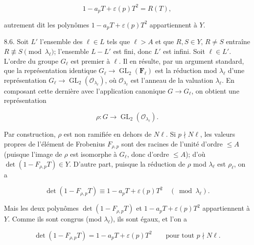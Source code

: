 \documentclass[10pt,oneside]{article}
\begin{document}
\begin{equation*}
1-a_pT+\varepsilon(p)T^2=R(T),
\end{equation*}

autrement dit les polynômes \(1-a_pT+\varepsilon(p)T^2\) appartiennent à \(Y\).\par

8.6. Soit \(L'\) l'ensemble des \(\ell\in L\) tels que \(\ell>A\) et que \(R,S\in Y\), \(R\ne S\) entraîne \(R\not\equiv S\pmod{\lambda_\ell}\); l'ensemble \(L-L'\) est fini, donc \(L'\) est infini. Soit \(\ell\in L'\). L'ordre du groupe \(G_\ell\) est premier à \(\ell\). Il en résulte, par un argument standard, que la représentation identique \(G_\ell\longrightarrow\operatorname{GL}_2(\mathbf F_\ell)\) est la réduction mod \(\lambda_\ell\) d'une représentation \(G_\ell\longrightarrow\operatorname{GL}_2(\mathcal O_{\lambda_\ell})\), où \(\mathcal O_{\lambda_\ell}\) est l'anneau de la valuation \(\lambda_\ell\). En composant cette dernière avec l'application canonique \(G\longrightarrow G_\ell\), on obtient une représentation\par

\begin{equation*}
\rho:G\longrightarrow\operatorname{GL}_2(\mathcal O_{\lambda_\ell}).
\end{equation*}

Par construction, \(\rho\) est non ramifiée en dehors de \(N\ell\). Si \(p\nmid N\ell\), les valeurs propres de l'élément de Frobenius \(F_{\rho,p}\) sont des racines de l'unité d'ordre \(\leq A\) (puisque l'image de \(\rho\) est isomorphe à \(G_\ell\), donc d'ordre \(\leq A\)); d'où \(\det(1-F_{\rho,p}T)\in Y\). D'autre part, puisque la réduction de \(\rho\) mod \(\lambda_\ell\) est \(\rho_\ell\), on a\par

\begin{equation*}
\det(1-F_{\rho,p}T)\equiv1-a_pT+\varepsilon(p)T^2
\quad(\bmod\lambda_\ell).
\end{equation*}

Mais les deux polynômes \(\det(1-F_{\rho,p}T)\) et \(1-a_pT+\varepsilon(p)T^2\) appartiennent à \(Y\). Comme ils sont congrus (mod \(\lambda_\ell\)), ils sont égaux, et l'on a\par

\begin{equation*}
\det(1-F_{\rho,p}T)=1-a_pT+\varepsilon(p)T^2
\qquad\text{pour tout }p\nmid N\ell.
\end{equation*}
\end{document}
